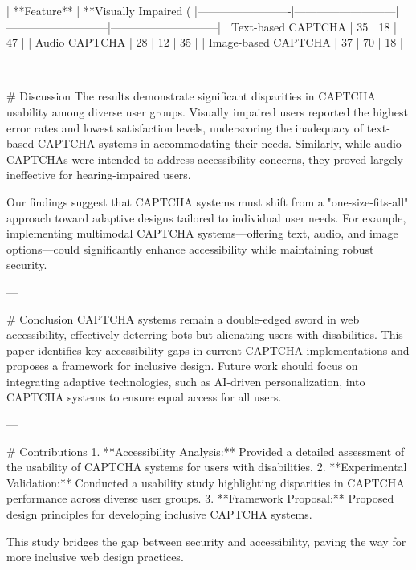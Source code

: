 | **Feature**            | **Visually Impaired (%
|-------------------------|---------------------------|---------------------------|-----------------------------|
| Text-based CAPTCHA     | 35                        | 18                        | 47                          |
| Audio CAPTCHA          | 28                        | 12                        | 35                          |
| Image-based CAPTCHA    | 37                        | 70                        | 18                          |

---

# Discussion  
The results demonstrate significant disparities in CAPTCHA usability among diverse user groups. Visually impaired users reported the highest error rates and lowest satisfaction levels, underscoring the inadequacy of text-based CAPTCHA systems in accommodating their needs. Similarly, while audio CAPTCHAs were intended to address accessibility concerns, they proved largely ineffective for hearing-impaired users.

Our findings suggest that CAPTCHA systems must shift from a "one-size-fits-all" approach toward adaptive designs tailored to individual user needs. For example, implementing multimodal CAPTCHA systems—offering text, audio, and image options—could significantly enhance accessibility while maintaining robust security.

---

# Conclusion  
CAPTCHA systems remain a double-edged sword in web accessibility, effectively deterring bots but alienating users with disabilities. This paper identifies key accessibility gaps in current CAPTCHA implementations and proposes a framework for inclusive design. Future work should focus on integrating adaptive technologies, such as AI-driven personalization, into CAPTCHA systems to ensure equal access for all users.  

---

# Contributions  
1. **Accessibility Analysis:** Provided a detailed assessment of the usability of CAPTCHA systems for users with disabilities.  
2. **Experimental Validation:** Conducted a usability study highlighting disparities in CAPTCHA performance across diverse user groups.  
3. **Framework Proposal:** Proposed design principles for developing inclusive CAPTCHA systems.  

This study bridges the gap between security and accessibility, paving the way for more inclusive web design practices.